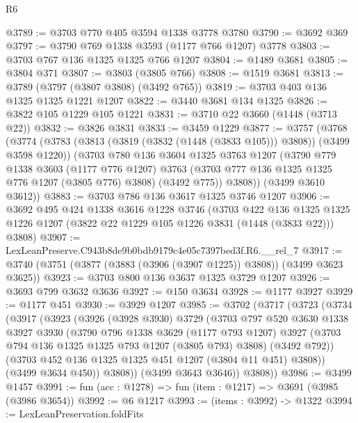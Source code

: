 \begin{lexlean}{R6}
\begin{coremodule}
@3789 := @3703 @770 @405 @3594 @1338 @3778 @3780
@3790 := @3692 @369
@3797 := @3790 @769 @1338 @3593 (@1177 @766 @1207) @3778
@3803 := @3703 @767 @136 @1325 @1325 @766 @1207
@3804 := @1489 @3681
@3805 := @3804 @371
@3807 := @3803 (@3805 @766)
@3808 := @1519 @3681
@3813 := @3789 (@3797 (@3807 @3808) (@3492 @765))
@3819 := @3703 @403 @136 @1325 @1325 @1221 @1207
@3822 := @3440 @3681 @134 @1325
@3826 := @3822 @105 @1229 @105 @1221
@3831 := @3710 @22 @3660 (@1448 (@3713 @22))
@3832 := @3826 @3831
@3833 := @3459 @1229
@3877 := @3757
    (@3768
      (@3774
        (@3783 (@3813 (@3819 (@3832 (@1448 (@3833 @105))) @3808)) (@3499 @3598 @1220))
        (@3703
          @780
          @136
          @3604
          @1325
          @3763
          @1207
          (@3790
            @779
            @1338
            @3603
            (@1177 @776 @1207)
            @3763
            (@3703 @777 @136 @1325 @1325 @776 @1207 (@3805 @776) @3808)
            (@3492 @775))
          @3808))
      (@3499 @3610 @3612))
@3883 := @3703 @786 @136 @3617 @1325 @3746 @1207
@3906 := @3692
    @495
    @424
    @1338
    @3616
    @1228
    @3746
    (@3703
      @422
      @136
      @1325
      @1325
      @1226
      @1207
      (@3822 @22 @1229 @105 @1226 @3831 (@1448 (@3833 @22)))
      @3808)
@3907 := LexLeanPreserve.C943b8de9b0bdb9179c4e05c7397bed3f.R6.__rel_7
@3917 := @3740 (@3751 (@3877 (@3883 (@3906 (@3907 @1225)) @3808)) (@3499 @3623 @3625))
@3923 := @3703 @800 @136 @3637 @1325 @3729 @1207
@3926 := @3693 @799 @3632 @3636
@3927 := @150 @3634
@3928 := @1177 @3927
@3929 := @1177 @451
@3930 := @3929 @1207
@3985 := @3702
    (@3717
      (@3723
        (@3734
          (@3917
            (@3923
              (@3926
                (@3928 @3930)
                @3729
                (@3703
                  @797
                  @520
                  @3630
                  @1338
                  @3927
                  @3930
                  (@3790
                    @796
                    @1338
                    @3629
                    (@1177 @793 @1207)
                    @3927
                    (@3703 @794 @136 @1325 @1325 @793 @1207 (@3805 @793) @3808)
                    (@3492 @792))
                  (@3703 @452 @136 @1325 @1325 @451 @1207 (@3804 @11 @451) @3808))
                (@3499 @3634 @450))
              @3808))
          (@3499 @3643 @3646))
        @3808))
@3986 := @3499 @1457
@3991 := fun (acc : @1278) => fun (item : @1217) => @3691 (@3985 (@3986 @3654))
@3992 := @6 @1217
@3993 := (items : @3992) -> @1322
@3994 := LexLeanPreservation.foldFits

\end{coremodule}
\end{lexlean}
